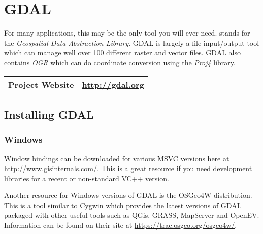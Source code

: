 %


\section*{GDAL}

For many applications, this may be the only tool you will ever need.  
stands for the \emph{Geospatial Data Abstraction Library}.  GDAL is largely 
a file input/output tool which can manage well over 100 different raster and vector
files.  GDAL also contains \emph{OGR} which can do coordinate conversion
using the \emph{Proj4} library.


\begin{table}[h!]
\begin{tabular}{l c}\hline
Project Website & \url{http://gdal.org} \\\hline
\end{tabular}
\end{table}


\subsection*{Installing GDAL}


\subsubsection*{Windows}

Window bindings can be downloaded for various MSVC versions here
at \url{http://www.gisinternals.com/}.  This is a great resource
if you need development libraries for a recent or non-standard
VC++ version. 

Another resource for Windows versions of GDAL is
the OSGeo4W distribution.  This is a tool similar
to Cygwin which provides the latest versions of GDAL packaged
with other useful tools such as QGis, GRASS, MapServer and OpenEV. 
Information can be found on their site at \url{https://trac.osgeo.org/osgeo4w/}.


